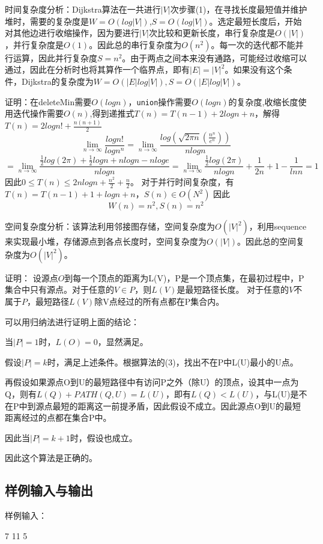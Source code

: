 \documentclass[UTF8,a4paperdui, %
]{ctexart}
\begin{document}
时间复杂度分析：Dijkstra算法在一共进行$|V|$次步骤(1)，在寻找长度最短值并维护堆时，需要的复杂度是$W=O(log|V|)$,$S=O(log|V|)$。选定最短长度后，开始对其他边进行收缩操作，因为要进行$|V|$次比较和更新长度，串行复杂度是$O(|V|)$，并行复杂度是$O(1)$。因此总的串行复杂度为$O(n^2)$。每一次的迭代都不能并行运算，因此并行复杂度$S=n^2$。由于两点之间本来没有通路，可能经过收缩可以通过，因此在分析时也将其算作一个临界点，即有$|E|=|V|^2$。如果没有这个条件，Dijkstra的复杂度为$W=O(|E|log|V|),S=O(|E|log|V|)$。

证明：在deleteMin需要$O(logn)$，\texttt{union}操作需要$O(logn)$的复杂度,收缩长度使用迭代操作需要$O(n)$,得到递推式$T(n)=T(n-1)+2logn+n$，解得$T(n)=2logn!+\frac{n(n+1)}{2}$
\[
\lim\limits_{n\rightarrow \infty}{\frac{logn!}{logn^n}}=\lim\limits_{n\rightarrow \infty}{\frac{log(\sqrt{2\pi n}(\frac{n^n}{e^n}))}{nlogn}}
\]
\[=\lim\limits_{n\rightarrow \infty}{\frac{\frac{1}{2}log(2\pi)+\frac{1}{2}logn+nlogn-nloge}{nlogn}}=\lim\limits_{n\rightarrow \infty}{\frac{\frac{1}{2}log(2\pi)}{nlogn}+\frac{1}{2n}+1-\frac{1}{lnn}}=1
\]
因此$0\leq T(n)\leq 2nlogn+\frac{n^2}{2}+\frac{n}{2}$。
对于并行时间复杂度，有$T(n)=T(n-1)+1+logn+n$，$S(n)\in O(N^2)$
因此
\[
W(n)=n^2,S(n)=n^2
\]

空间复杂度分析：该算法利用邻接图存储，空间复杂度为$O(|V|^2)$，利用sequence来实现最小堆，存储源点到各点长度时，空间复杂度为$O(|V|)$。因此总的空间复杂度为$O(|V|^2)$。


证明：
设源点$O$到每一个顶点的距离为L(V)，P是一个顶点集，在最初过程中，P集合中只有源点。对于任意的$V\in P$，则$L(V)$是最短路径长度。
对于任意的$V$不属于$P$，最短路径$L(V)$除V点经过的所有点都在P集合内。

可以用归纳法进行证明上面的结论：

当$|P|=1$时，$L(O)=0$，显然满足。

假设$|P|=k$时，满足上述条件。根据算法的(3)，找出不在P中L(U)最小的U点。

再假设如果源点O到U的最短路径中有访问P之外（除U）的顶点，设其中一点为Q，则有$L(Q)+PATH(Q, U)= L(U)$，即有$L(Q)<L(U)$，与L(U)是不在P中到源点最短的距离这一前提矛盾，因此假设不成立。因此源点O到U的最短距离经过的点都在集合P中。

因此当$|P|=k+1$时，假设也成立。

因此这个算法是正确的。

\subsection{样例输入与输出}
样例输入：

7 11 5
\end{document}
